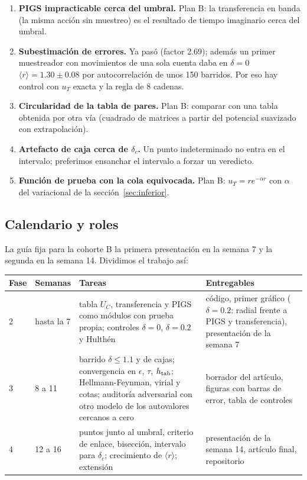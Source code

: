 \documentclass[11pt]{article}
\newcommand{\dc}{\delta_c}
\begin{document}
\begin{enumerate}
\item \textbf{PIGS impracticable cerca del umbral.} Plan B: la transferencia en banda (la misma acción sin muestreo) es el resultado de tiempo imaginario cerca del umbral.
\item \textbf{Subestimación de errores.} Ya pasó (factor 2.69); además un primer muestreador con movimientos de una sola cuenta daba en $\delta=0$ $\langle r\rangle=1.30\pm0.08$ por autocorrelación de unos 150 barridos. Por eso hay control con $u_T$ exacta y la regla de 8 cadenas.
\item \textbf{Circularidad de la tabla de pares.} Plan B: comparar con una tabla obtenida por otra vía (cuadrado de matrices a partir del potencial suavizado con extrapolación).
\item \textbf{Artefacto de caja cerca de $\dc$.} Un punto indeterminado no entra en el intervalo; preferimos ensanchar el intervalo a forzar un veredicto.
\item \textbf{Función de prueba con la cola equivocada.} Plan B: $u_T=re^{-\alpha r}$ con $\alpha$ del variacional de la sección~\ref{sec:inferior}.
\end{enumerate}

\subsection{Calendario y roles}
\label{sec:roles}

La guía fija para la cohorte B la primera presentación en la semana 7 y la segunda en la semana 14. Dividimos el trabajo así:

\begin{table}[H]
\centering
\small
\begin{tabular}{@{}lL{2cm}L{6.3cm}L{4.3cm}@{}}
\toprule
\textbf{Fase} & \textbf{Semanas} & \textbf{Tareas} & \textbf{Entregables}\\
 & hasta la 7 & tabla $U_C$, transferencia y PIGS como módulos con prueba propia; controles $\delta=0$, $\delta=0.2$ y Hulthén & código, primer gráfico ($\delta=0.2$: radial frente a PIGS y transferencia), presentación de la semana 7\\
3 & 8 a 11 & barrido $\delta\le1.1$ y de cajas; convergencia en $\epsilon$, $\tau$, $h_{\rm tab}$; Hellmann-Feynman, virial y cotas; auditoría adversarial con otro modelo de los autovalores cercanos a cero & borrador del artículo, figuras con barras de error, tabla de controles\\
4 & 12 a 16 & puntos junto al umbral, criterio de enlace, bisección, intervalo para $\dc$; crecimiento de $\langle r\rangle$; extensión & presentación de la semana 14, artículo final, repositorio\\
\bottomrule
\end{tabular}
\end{table}
\end{document}
